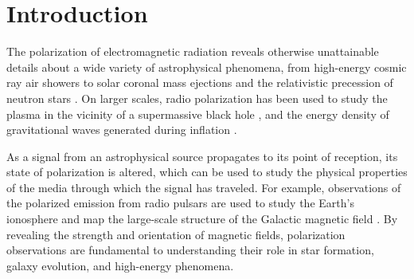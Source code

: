 \section{Introduction}
\label{sec:intro}

The polarization of electromagnetic radiation reveals otherwise unattainable details about a wide variety of astrophysical phenomena,
%
from high-energy cosmic ray air showers \citep{2014PhRvD..89e2002A,2014JCAP...10..014S}
to solar coronal mass ejections \citep{kmo24}
%
and the relativistic precession of neutron stars \citep{dkl+19}.
%
On larger scales, radio polarization has been used to study the plasma in the vicinity of a supermassive black hole \citep{2021ApJ...910L..13E},
%
and the energy density of gravitational waves generated during inflation \citep{pol85,pla20}.
%

As a signal from an astrophysical source propagates to its point of reception, its state of polarization is altered, which can be used to study the physical properties of the media through which the signal has traveled.
%
For example, observations of the polarized emission from radio pulsars are used to study the Earth's ionosphere \citep{pmh+23} and map the large-scale structure of the Galactic magnetic field \citep{bbm+96,hmvd18}.
%
By revealing the strength and orientation of magnetic fields, polarization observations are fundamental to understanding their role in star formation, galaxy evolution, and high-energy phenomena.




